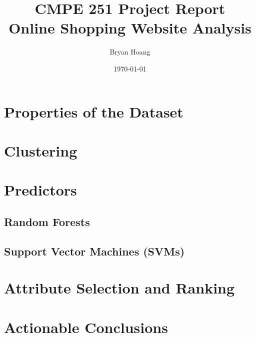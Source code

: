 \documentclass[
  oneside,
  12pt,
  draft,
]{memoir}
\title{
  \textbf{CMPE 251 Project Report}\\
  Online Shopping Website Analysis
}
\author{Bryan Hoang}
\date{\today}
\begin{document}
  \begin{titlingpage}
    \maketitle
  \end{titlingpage}
  \frontmatter
  \tableofcontents
  \listoffigures
  \listoftables
  \mainmatter{}
  \chapter{Properties of the Dataset}
  \chapter{Clustering}
  \chapter{Predictors}
  \section{Random Forests}
  \section{Support Vector Machines (SVMs)}
  \chapter{Attribute Selection and Ranking}
  \chapter{Actionable Conclusions}
\end{document}
